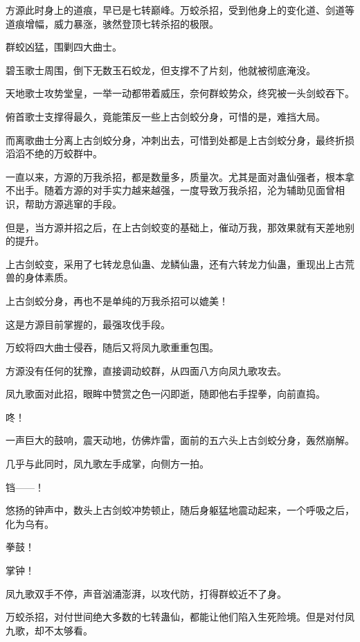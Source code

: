 
\begin{this_body}



方源此时身上的道痕，早已是七转巅峰。万蛟杀招，受到他身上的变化道、剑道等道痕增幅，威力暴涨，骇然登顶七转杀招的极限。

群蛟凶猛，围剿四大曲士。

碧玉歌士周围，倒下无数玉石蛟龙，但支撑不了片刻，他就被彻底淹没。

天地歌士攻势堂皇，一举一动都带着威压，奈何群蛟势众，终究被一头剑蛟吞下。

俯首歌士支撑得最久，竟能策反一些上古剑蛟分身，可惜的是，难挡大局。

而离歌曲士分离上古剑蛟分身，冲刺出去，可惜到处都是上古剑蛟分身，最终折损滔滔不绝的万蛟群中。

一直以来，方源的万我杀招，都是数量多，质量次。尤其是面对蛊仙强者，根本拿不出手。随着方源的对手实力越来越强，一度导致万我杀招，沦为辅助见面曾相识，帮助方源逃窜的手段。

但是，当方源并招之后，在上古剑蛟变的基础上，催动万我，那效果就有天差地别的提升。

上古剑蛟变，采用了七转龙息仙蛊、龙鳞仙蛊，还有六转龙力仙蛊，重现出上古荒兽的身体素质。

上古剑蛟分身，再也不是单纯的万我杀招可以媲美！

这是方源目前掌握的，最强攻伐手段。

万蛟将四大曲士侵吞，随后又将凤九歌重重包围。

方源没有任何的犹豫，直接调动蛟群，从四面八方向凤九歌攻去。

凤九歌面对此招，眼眸中赞赏之色一闪即逝，随即他右手捏拳，向前直捣。

咚！

一声巨大的鼓响，震天动地，仿佛炸雷，面前的五六头上古剑蛟分身，轰然崩解。

几乎与此同时，凤九歌左手成掌，向侧方一拍。

铛——！

悠扬的钟声中，数头上古剑蛟冲势顿止，随后身躯猛地震动起来，一个呼吸之后，化为乌有。

拳鼓！

掌钟！

凤九歌双手不停，声音汹涌澎湃，以攻代防，打得群蛟近不了身。

万蛟杀招，对付世间绝大多数的七转蛊仙，都能让他们陷入生死险境。但是对付凤九歌，却不太够看。


\end{this_body}
